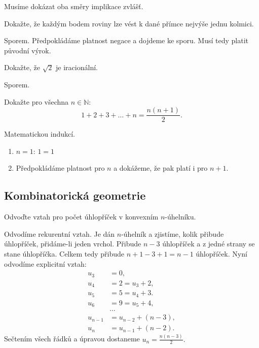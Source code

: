 \begin{reseni}
Musíme dokázat oba směry implikace zvlášť.
\end{reseni}

\begin{priklad}
Dokažte, že každým bodem roviny lze vést k dané přímce nejvýše jednu kolmici.
\end{priklad}

\begin{reseni}
Sporem. Předpokládáme platnost negace a dojdeme ke sporu. Musí tedy platit původní výrok.
\end{reseni}

\begin{priklad}
Dokažte, že $\sqrt{2} $ je iracionální.
\end{priklad}

\begin{reseni}
Sporem.
\end{reseni}

\begin{priklad}
Dokažte pro všechna $n\in \mathbb N\colon $
$$1+2+3+\dots+n=\frac{n(n+1)}{2}.$$
\end{priklad}

\begin{reseni}
Matematickou indukcí.
\begin{enumerate}[1.]
\item $n=1$: $1=1$
\item Předpokládáme platnost pro $n$ a dokážeme, že pak platí i pro $n+1$.
\end{enumerate}
\end{reseni}

\subsection{Kombinatorická geometrie}
\begin{priklad}
Odvoďte vztah pro počet úhlopříček v konvexním $n$-úhelníku.
\end{priklad}

\begin{reseni}
Odvodíme rekurentní vztah. Je dán $n$-úhelník a zjistíme, kolik přibude
úhlopříček, přidáme-li jeden vrchol. Přibude $n-3$ úhlopříček a z jedné strany
se stane úhlopříčka. Celkem tedy přibude $n+1-3+1=n-1$ úhlopříček. Nyní odvodíme
explicitní vztah:
\begin{align*}
    u_3 &= 0,\\
    u_4 &= 2=u_3+2,\\
    u_5 &= 5=u_4+3. \\
    u_6&=9=u_5+4,\\
    &\dots \\
    u_{n-1}&=u_{n-2}+(n-3),\\
    u_n &= u_{n-1}+(n-2).
\end{align*}
Sečtením všech řádků a úpravou dostaneme $u_n=\frac{n(n-3)}{2}.$
\end{reseni}

